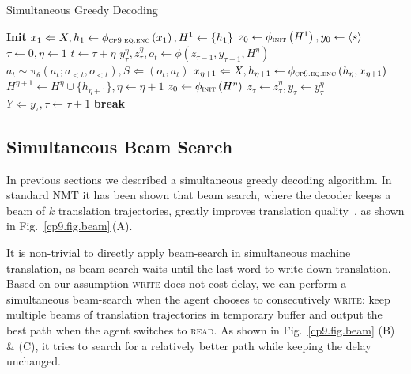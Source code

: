 \begin{algorithm}
\caption{Simultaneous Greedy Decoding}
\label{cp9.algo.algo1}
\begin{algorithmic}[1]
{}
\State \textbf{Init} $x_1 \Leftarrow X, h_1 \gets \phi_{\textsc{cp9.eq.enc}}\left(x_1\right), H^1 \gets \{h_1\}$
\State \hspace{17pt} $z_0 \gets \phi_{\textsc{init}}\left(H^1\right), y_0 \gets \left<s\right>$
\State \hspace{17pt} $\tau \gets 0, \eta \gets 1$
\State $t \gets \tau + \eta$
\State $y_{\tau}^{\eta}, z_{\tau}^{\eta}, o_t \gets \phi\left(z_{\tau-1}, y_{\tau-1}, H^{\eta}\right)$ 
\State $a_t \sim \pi_{\theta}\left(a_t; a_{<t}, o_{<t}\right), S \Leftarrow (o_t, a_t)$
\State $x_{\eta+1} \Leftarrow X, h_{\eta+1} \gets \phi_{\textsc{cp9.eq.enc}}\left(h_{\eta}, x_{\eta+1}\right)$
\State $H^{\eta+1} \gets H^{\eta} \cup \{h_{\eta+1} \}, \eta \gets \eta + 1$
 $z_0 \gets \phi_{\textsc{init}}\left(H^{\eta}\right)$
\EndIf
{}
\State $z_{\tau} \gets z_{\tau}^{\eta}, y_{\tau} \gets y_{\tau}^{\eta}$ 
\State $Y \Leftarrow y_{\tau}, \tau \gets \tau + 1$
 \textbf{break}
\EndIf
\EndIf
\EndWhile
\end{algorithmic}
\end{algorithm}


\subsection{Simultaneous Beam Search}
\label{cp9.sec.beamsearch}

In previous sections we described a simultaneous greedy decoding algorithm. In standard NMT it has been shown that beam search, where the decoder keeps a beam of $k$ translation trajectories, greatly improves translation quality~\cite{sutskever2014sequence}, as shown in Fig.~\ref{cp9.fig.beam}\,(A). 

It is non-trivial to directly apply beam-search in simultaneous machine translation,
as beam search waits until the last word to write down translation. Based on our assumption \textsc{write} does not cost delay,
we can perform a simultaneous beam-search when the agent chooses to consecutively \textsc{write}: keep multiple beams of translation trajectories in temporary buffer and output the best path when the agent switches to \textsc{read}. As shown in Fig.~\ref{cp9.fig.beam} (B) \& (C), it tries to search for a relatively better path while keeping the delay unchanged.

